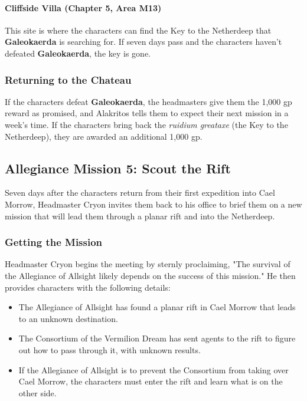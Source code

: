 \documentclass[a4paper, 11pt, bg=full, twocolumn, nooutline]{dndbook}
\begin{document}
\paragraph{Cliffside Villa (Chapter 5, Area M13)}

This site is where the characters can find the Key to the Netherdeep that \textbf{Galeokaerda} is searching for. If seven days pass and the characters haven't defeated \textbf{Galeokaerda}, the key is gone.

\subsubsection{Returning to the Chateau}

If the characters defeat \textbf{Galeokaerda}, the headmasters give them the 1,000 gp reward as promised, and Alakritos tells them to expect their next mission in a week's time. If the characters bring back the \textit{ruidium greataxe} (the Key to the Netherdeep), they are awarded an additional 1,000 gp.

\subsection{Allegiance Mission 5: Scout the Rift}

Seven days after the characters return from their first expedition into Cael Morrow, Headmaster Cryon invites them back to his office to brief them on a new mission that will lead them through a planar rift and into the Netherdeep.

\subsubsection{Getting the Mission}

Headmaster Cryon begins the meeting by sternly proclaiming, "The survival of the Allegiance of Allsight likely depends on the success of this mission." He then provides characters with the following details:

\begin{itemize}
\item The Allegiance of Allsight has found a planar rift in Cael Morrow that leads to an unknown destination.
\item The Consortium of the Vermilion Dream has sent agents to the rift to figure out how to pass through it, with unknown results.
\item If the Allegiance of Allsight is to prevent the Consortium from taking over Cael Morrow, the characters must enter the rift and learn what is on the other side.
\end{itemize}
\end{document}
